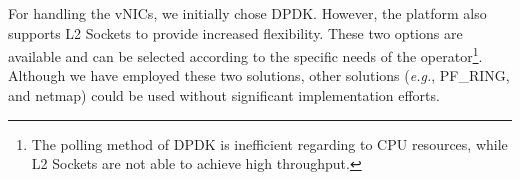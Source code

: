 For handling the vNICs, we initially chose DPDK. However, the platform also supports L2 Sockets to provide increased flexibility. These two options are available and can be selected according to the specific needs of the operator\footnote{The polling method of DPDK is inefficient regarding to CPU resources, while L2 Sockets are not able to achieve high throughput.}. Although we have employed these two solutions, other solutions (\textit{e.g.}, PF\_RING, and netmap) could be used without significant implementation efforts.





